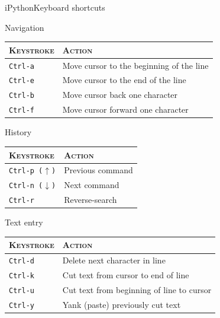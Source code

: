 \documentclass[10pt,compress]{beamer} %
\begin{document}
\begin{frame}{iPython}{Keyboard shortcuts}
    \footnotesize{
        Navigation\\
        \begin{tabular}{ll}\hline
       \textsc{Keystroke} &  \textsc{Action}\\ \hline
	   \texttt{Ctrl-a} & Move cursor to the beginning of the line  \\
	   \texttt{Ctrl-e} & Move cursor to the end of the line  \\
	   \texttt{Ctrl-b} & Move cursor back one character  \\
	   \texttt{Ctrl-f} & Move cursor forward one character  \\\hline
        \end{tabular}

    \bigskip
     History\\
       \begin{tabular}{ll}\hline
       \textsc{Keystroke} &  \textsc{Action}\\ \hline
       \texttt{Ctrl-p ($\uparrow$)} & Previous command  \\
       \texttt{Ctrl-n ($\downarrow$)} & Next command  \\
	   \texttt{Ctrl-r} & Reverse-search  \\\hline
    \end{tabular}

    \bigskip
        Text entry\\
        \begin{tabular}{ll}\hline
       \textsc{Keystroke} &  \textsc{Action}\\ \hline
	   \texttt{Ctrl-d} & Delete next character in line  \\
	   \texttt{Ctrl-k} & Cut text from cursor to end of line  \\
	   \texttt{Ctrl-u} & Cut text from beginning of line to cursor  \\
       \texttt{Ctrl-y} & Yank (paste) previously cut text  \\\hline
       \end{tabular}
   }
\end{frame}
\end{document}
